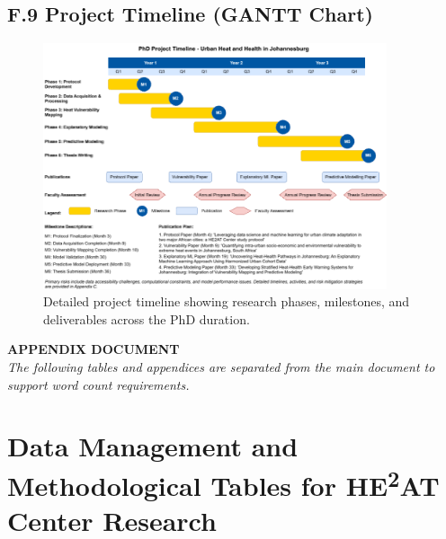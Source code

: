 \documentclass[12pt,a4paper,landscape]{article}
\begin{document}
\subsection*{F.9 Project Timeline (GANTT Chart)}
\begin{figure}[H]
    \centering
    \includegraphics[width=0.9\textwidth]{images/GNT.png}
    \caption{Detailed project timeline showing research phases, milestones, and deliverables across the PhD duration.}
    \label{fig:gantt}
\end{figure}

\begin{center}
    \Large\textbf{APPENDIX DOCUMENT}\\[0.5em]
    \normalsize\textit{The following tables and appendices are separated from the main document to support word count requirements.}
\end{center}

\section*{Data Management and Methodological Tables for HE\textsuperscript{2}AT Center Research}

\end{document}
